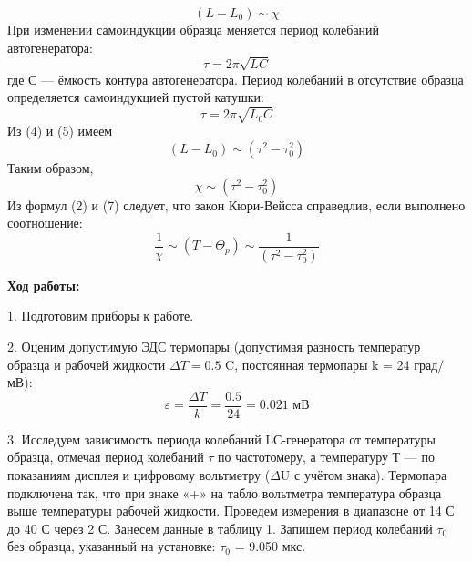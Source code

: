 \documentclass[a4paper,12pt]{article}
\begin{document}
\begin{equation}
(L-L_0) \sim \chi
\end{equation}
При изменении самоиндукции образца меняется период колебаний автогенератора:
\begin{equation}
\tau = 2 \pi \sqrt {LC}
\end{equation}
где С — ёмкость контура автогенератора.
Период колебаний в отсутствие образца определяется самоиндукцией пустой катушки:
\begin{equation}
\tau = 2 \pi \sqrt {L_0C}
\end{equation}
Из (4) и (5) имеем
\begin{equation}
(L-L_0) \sim (\tau^2 - \tau_0^2)
\end{equation}
Таким образом,
\begin{equation}
\chi \sim (\tau^2 - \tau_0^2)
\end{equation}
Из формул (2) и (7) следует, что закон Кюри-Вейсса справедлив, если выполнено соотношение:
\begin{equation}
\frac {1}{\chi} \sim (T-\Theta_p) \sim \frac{1}{(\tau^2 - \tau_0^2)}
\end{equation}
\par \textbf{Ход работы:}
\par 1. Подготовим приборы к работе.
\par 2. Оценим допустимую ЭДС термопары (допустимая разность температур образца и рабочей жидкости $\Delta T = 0.5$ \degree C, постоянная термопары k = 24 град/мВ):
\begin{equation}
	\varepsilon = \frac{\Delta T}{k} = \frac {0.5}{24} = 0.021 \text{ мВ}
\end{equation}
\par 3. Исследуем зависимость периода колебаний LС-генератора от температуры образца, отмечая период колебаний $\tau$ по частотомеру, а температуру Т — по показаниям дисплея и цифровому вольтметру ($\Delta$U с учётом знака). Термопара подключена так, что при знаке «+» на табло вольтметра температура образца выше температуры рабочей жидкости.
Проведем измерения в диапазоне от 14 \degree С до 40 \degree С через 2 \degree С. Занесем данные в таблицу 1.
Запишем период колебаний $\tau_0$ без образца, указанный на установке: $\tau_0$ = 9.050 мкс.
\end{document}
